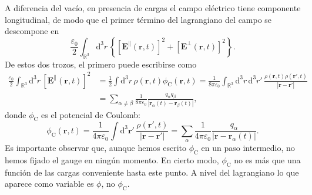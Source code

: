 A diferencia del vacío, en presencia de cargas el campo eléctrico tiene componente longitudinal, de modo que el primer término del lagrangiano del campo se descompone en
\begin{equation*}
    \frac{\varepsilon_0}{2}\int_{\mathbb{R}^3}\mathrm{d}^3r\,\left\{\left[\mathbf{E}^\parallel(\mathbf{r}, t)\right]^2 + \left[\mathbf{E}^\perp(\mathbf{r}, t)\right]^2\right\}.
\end{equation*}
De estos dos trozos, el primero puede escribirse como 
\begin{align*}
    \frac{\varepsilon_0}{2}\int_{\mathbb{R}^3}\mathrm{d}^3r\, \left[\mathbf{E}^\parallel(\mathbf{r}, t)\right]^2 &= \frac{1}{2}\int\mathrm{d}^3r\, \rho(\mathbf{r}, t)\phi_\mathrm{C}(\mathbf{r}, t) = \frac{1}{8\pi\varepsilon_0}\int_{\mathbb{R}^3}\mathrm{d}^3r\,\mathrm{d}^3r'\,\frac{\rho(\mathbf{r}, t)\rho(\mathbf{r'}, t)}{\left|\mathbf{r}-\mathbf{r}'\right|}\\
    & = \sum_{\alpha\neq\beta} \frac{1}{8\pi\varepsilon_0} \frac{q_\alpha q_\beta}{\left|\mathbf{r}_\alpha(t) - \mathbf{r}_\beta(t)\right|},
\end{align*}
donde \(\phi_\mathrm{C}\) es el potencial de Coulomb:
\begin{equation}
    \phi_\mathrm{C}(\mathbf{r}, t) = \frac{1}{4\pi\varepsilon_0}\int\mathrm{d}^3\mathbf{r}'\, \frac{\rho(\mathbf{r}', t)}{|\mathbf{r}-\mathbf{r}'|} = \sum_\alpha\frac{1}{4\pi\varepsilon_0}\frac{q_\alpha}{|\mathbf{r}-\mathbf{r}_\alpha(t)|}.
\end{equation}
Es importante observar que, aunque hemos escrito \(\phi_\mathrm{C}\) en un paso intermedio, no hemos fijado el gauge en ningún momento. En cierto modo, \(\phi_\mathrm{C}\) no es más que una función de las cargas conveniente hasta este punto. A nivel del lagrangiano lo que aparece como variable es \(\phi\), no \(\phi_\mathrm{C}\). 

